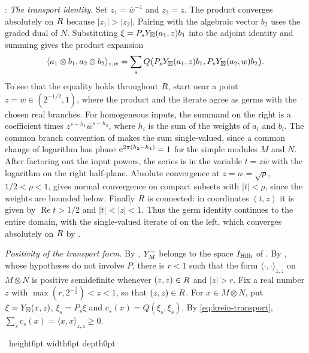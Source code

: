 \documentclass[leqno]{article}
\let\cal\relax
\newcommand{\cal}{\mathcal}
\renewcommand{\geq}{\ensuremath{\geqslant}}
\newcommand{\qed}{\hfill \vrule height6pt  width6pt depth0pt}
\newcommand{\ot}{\otimes}
\newcommand{\ovl}{\overline}
\let\i\relax %
\newcommand{\i}{\mathrm{i}}
\newcommand{\e}{\mathrm{e}} %
\newenvironment{proof}[1][]{\noindent {\it Proof #1} : }{\hbox{~}\qed
\smallskip
}
\numberwithin{equation}{section}
\begin{document}
\begin{proof}
\emph{The transport identity.} Set $z_1=\ovl w^{-1}$ and $z_2=z$. The product converges absolutely on $\cal R$ because $|z_1|>|z_2|$. Pairing with the algebraic vector $b_2$ uses the graded dual of $N$. Substituting $\xi=P_s\cal Y_\boxtimes(a_1,z)b_1$ into the adjoint identity and summing gives the product expansion
\begin{equation}
\label{eq:krein-transport}
\langle a_1\ot b_1,a_2\ot b_2\rangle_{z,w}
 = \sum_s Q\bigl(P_s\cal Y_\boxtimes(a_1,z)b_1,
                P_s\cal Y_\boxtimes(a_2,w)b_2\bigr).
\end{equation}
To see that the equality holds throughout $\cal R$, start near a point $z=w\in(2^{-1/2},1)$, where the product and the iterate agree as germs with the chosen real branches. For homogeneous inputs, the summand on the right is a coefficient times $z^{s-h_1}\ovl w^{s-h_2}$, where $h_i$ is the sum of the weights of $a_i$ and $b_i$. The common branch convention of \cite[Section 3.1]{Ten24} makes the sum single-valued, since a common change of logarithm has phase $\e^{2\pi\i(h_2-h_1)}=1$ for the simple modules $M$ and $N$. After factoring out the input powers, the series is in the variable $t=z\ovl w$ with the logarithm on the right half-plane. Absolute convergence at $z=w=\sqrt{\rho}$, $1/2<\rho<1$, gives normal convergence on compact subsets with $|t|<\rho$, since the weights are bounded below. Finally $\cal R$ is connected: in coordinates $(t,z)$ it is given by $\operatorname{Re} t>1/2$ and $|t|<|z|<1$. Thus the germ identity continues to the entire domain, with the single-valued iterate of \cite[Definition 3.1]{Ten24} on the left, which converges absolutely on $\cal R$ by \cite[Proposition 3.11 p.~33]{Ten24}.

\emph{Positivity of the transport form.} By \cite[Proposition 3.11 p.~33]{Ten24}, $\cal Y^-_M$ belongs to the space $\cal I_{\mathrm{Hilb}}$ of \cite[Definition 2.8 p.~12]{Ten24}. By \cite[Proposition 4.2 p.~43]{Ten24}, whose hypotheses do not involve $P$, there is $r < 1$ such that the form $\langle\cdot,\cdot\rangle_{z,z}$ on $M \ot N$ is positive semidefinite whenever $(z,z) \in \cal R$ and $|z| > r$. Fix a real number $z$ with $\max(r,2^{-\frac12}) < z < 1$, so that $(z,z) \in \cal R$. For $x \in M \ot N$, put $\xi = \cal Y_\boxtimes(x,z)$, $\xi_s = P_s\xi$ and $c_s(x) = Q(\xi_s,\xi_s)$. By \eqref{eq:krein-transport}, $\sum_s c_s(x) = \langle x,x\rangle_{z,z} \geq 0$.


\end{proof}
\end{document}
